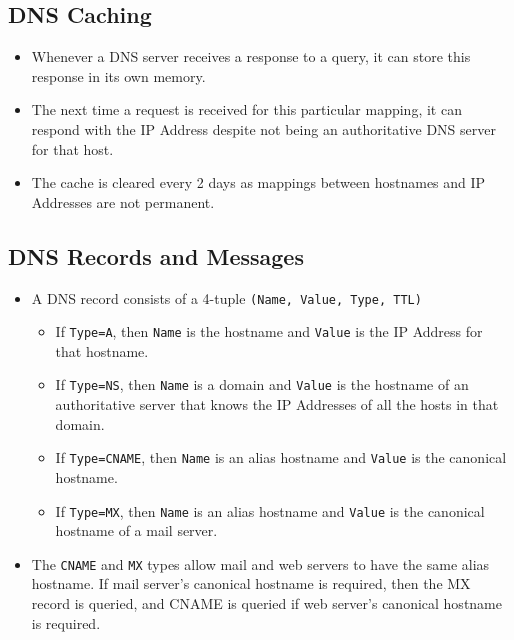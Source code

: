 \documentclass{article}
\theoremstyle{plain}
\theoremstyle{definition}
\begin{document}
\subsection{DNS Caching}
\begin{itemize}
    \item Whenever a DNS server receives a response to a query, it can store this response in its own memory.
    
    \item The next time a request is received for this particular mapping, it can respond with the IP Address despite not being an authoritative DNS server for that host. 
    
    \item The cache is cleared every 2 days as mappings between hostnames and IP Addresses are not permanent. 
\end{itemize}

\subsection{DNS Records and Messages}
\begin{itemize}
    \item A DNS record consists of a 4-tuple \texttt{(Name, Value, Type, TTL)}
    
    \begin{itemize}
        \item If \texttt{Type=A}, then \texttt{Name} is the hostname and \texttt{Value} is the IP Address for that hostname. 
        
        \item If \texttt{Type=NS}, then \texttt{Name} is a domain and \texttt{Value} is the hostname of an authoritative server that knows the IP Addresses of all the hosts in that domain.
        
        \item If \texttt{Type=CNAME}, then \texttt{Name} is an alias hostname and \texttt{Value} is the canonical hostname.
        
        \item If \texttt{Type=MX}, then \texttt{Name} is an alias hostname and \texttt{Value} is the canonical hostname of a mail server. 
    \end{itemize}
    
    \item The \texttt{CNAME} and \texttt{MX} types allow mail and web servers to have the same alias hostname. If mail server's canonical hostname is required, then the MX record is queried, and CNAME is queried if web server's canonical hostname is required. 
\end{itemize}
\end{document}
